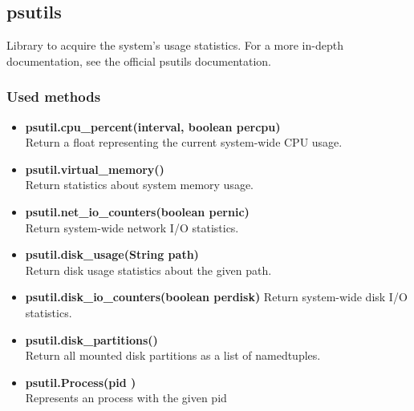 	
\subsection{psutils}
Library to acquire the system's usage statistics. For a more in-depth documentation, see the official psutils documentation.

\subsubsection{Used methods}
\begin{itemize}
	\item \textbf{psutil.cpu\_percent(interval, boolean percpu)}\\
	Return a float representing the current system-wide CPU usage.
	\item \textbf{psutil.virtual\_memory()}\\
	Return statistics about system memory usage.
	\item \textbf{psutil.net\_io\_counters(boolean pernic)}\\
	Return system-wide network I/O statistics.
	\item \textbf{psutil.disk\_usage(String path)}\\
	Return disk usage statistics about the given path.
	\item \textbf{psutil.disk\_io\_counters(boolean perdisk)}
	Return system-wide disk I/O statistics.
	\item \textbf{psutil.disk\_partitions()}\\
	Return all mounted disk partitions as a list of namedtuples.
	\item \textbf{psutil.Process(pid )}\\
	Represents an  process with the given pid
\end{itemize}


	